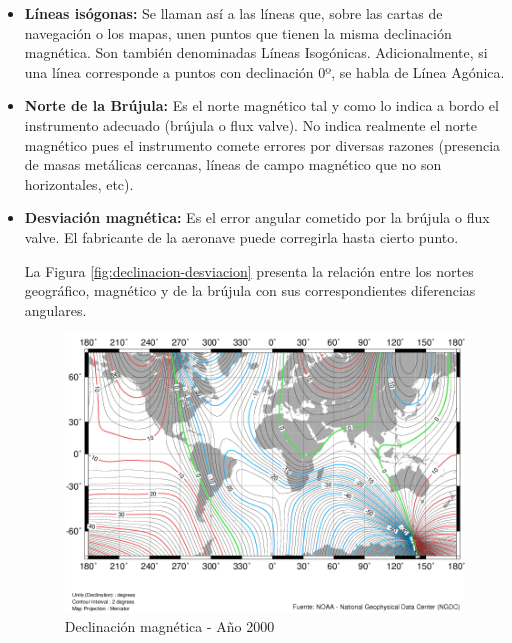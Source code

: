 \documentclass[a4paper,12pt,twoside]{article}
\begin{document}
\begin{itemize}
\item \textbf{Líneas isógonas:} Se llaman así a las líneas que, sobre las cartas de navegación o los mapas, unen puntos que tienen la misma declinación magnética. Son también denominadas Líneas Isogónicas. Adicionalmente, si una línea corresponde a puntos con declinación 0º, se habla de Línea Agónica. 

\item \textbf{Norte de la Brújula:} Es el norte magnético tal y como lo indica a bordo el instrumento adecuado (brújula o flux valve). No indica realmente el norte magnético pues el instrumento comete errores por diversas razones (presencia de masas metálicas cercanas, líneas de campo magnético que no son horizontales, etc).

\item \textbf{Desviación magnética:} Es el error angular cometido por la brújula o flux valve. El fabricante de la aeronave puede corregirla hasta cierto punto.

La Figura \ref{fig:declinacion-desviacion} presenta la relación entre los nortes geográfico, magnético y de la brújula con sus correspondientes diferencias angulares.

\begin{figure}[!htb]
    \centering
\includegraphics[keepaspectratio,width=\textwidth]{./Imagenes/declinacion-magnetica-anio-2000.png}
\caption{Declinaci\'on magn\'etica - A\~no 2000 \cite{Salazar_nav_aerea}}
\label{fig:declinacion-magnetica-anio-2000}
\end{figure}


\end{itemize}
\end{document}
